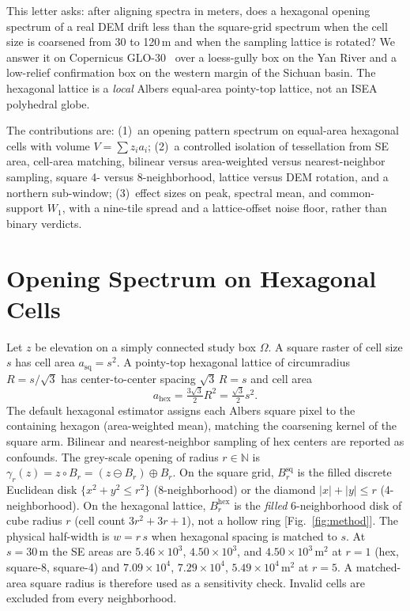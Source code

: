 \documentclass[journal]{IEEEtran}
\newif\ifhighlight
\newcommand{\rev}[1]{\ifhighlight\textcolor{blue}{#1}\else#1\fi}
\begin{document}
This letter asks: after aligning spectra in meters, does a hexagonal opening
spectrum of a real DEM drift less than the square-grid spectrum when the cell
size is coarsened from 30 to 120\,m and when the sampling lattice is rotated?
We answer it on Copernicus GLO-30~\cite{copernicus2021dem} over a loess-gully
box on the Yan River and a low-relief confirmation box on the western margin of
the Sichuan basin.
The hexagonal lattice is a \emph{local} Albers \mbox{equal-area} \mbox{pointy-top}
lattice, not an ISEA polyhedral globe.

The contributions are: (1)~an opening pattern spectrum on equal-area
hexagonal cells with volume \(V=\sum z_i a_i\);
(2)~\rev{a controlled isolation of tessellation from SE area, cell-area matching,
bilinear versus area-weighted versus nearest-neighbor sampling, square 4- versus
8-neighborhood, lattice versus DEM rotation, and a northern sub-window};
(3)~\rev{effect sizes on peak, spectral mean, and common-support \(W_1\), with a
nine-tile spread and a lattice-offset noise floor, rather than binary verdicts}.

\section{Opening Spectrum on Hexagonal Cells}

Let \(z\) be elevation on a simply connected study box \(\Omega\).
A square raster of cell size \(s\) has cell area \(a_{\mathrm{sq}}=s^2\).
A pointy-top hexagonal lattice of circumradius \(R=s/\sqrt{3}\) has
center-to-center spacing \(\sqrt{3}\,R=s\) and cell area
\begin{equation}
a_{\mathrm{hex}}=\tfrac{3\sqrt{3}}{2}R^{2}=\tfrac{\sqrt{3}}{2}s^{2}.
\end{equation}
\rev{The default hexagonal estimator assigns each Albers square pixel to the containing
hexagon (area-weighted mean), matching the coarsening kernel of the square arm.
Bilinear and nearest-neighbor sampling of hex centers are reported as confounds.}
The grey-scale opening of radius \(r\in\mathbb{N}\) is
\(\gamma_r(z)=z\circ B_r=(z\ominus B_r)\oplus B_r\).
On the square grid, \(B_r^{\mathrm{sq}}\) is the filled discrete Euclidean disk
\(\{x^2+y^2\le r^2\}\) (8-neighborhood) or the diamond \(\lvert x\rvert+\lvert y\rvert\le r\)
(4-neighborhood). On the hexagonal lattice, \(B_r^{\mathrm{hex}}\) is the
\emph{filled} 6-neighborhood disk of cube radius \(r\) (cell count \(3r^2+3r+1\)),
not a hollow ring [Fig.~\ref{fig:method}].
The physical half-width is \(w=r\,s\) when hexagonal spacing is matched to \(s\).
\rev{At \(s=30\,\mathrm{m}\) the SE areas are \(5.46\times 10^3\), \(4.50\times 10^3\),
and \(4.50\times 10^3\,\mathrm{m}^2\) at \(r=1\) (hex, square-8, square-4) and
\(7.09\times 10^4\), \(7.29\times 10^4\), \(5.49\times 10^4\,\mathrm{m}^2\) at \(r=5\).
A matched-area square radius is therefore used as a sensitivity check.}
Invalid cells are excluded from every neighborhood.
\end{document}
